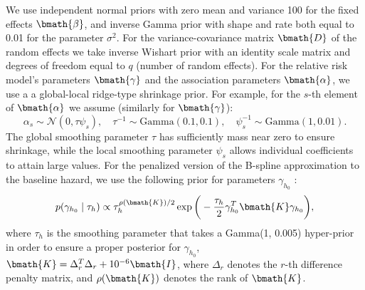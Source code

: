 We use independent normal priors with zero mean and variance 100 for the fixed effects $\bmath{\beta}$, and inverse Gamma prior with shape and rate both equal to 0.01 for the parameter $\sigma^2$. For the variance-covariance matrix $\bmath{D}$ of the random effects we take inverse Wishart prior with an identity scale matrix and degrees of freedom equal to $q$ (number of random effects). For the relative risk model's parameters $\bmath{\gamma}$ and the association parameters $\bmath{\alpha}$, we use a a global-local ridge-type shrinkage prior. For example, for the $s$-{th} element of $\bmath{\alpha}$ we assume (similarly for $\bmath{\gamma}$):
\begin{equation*} 
\alpha_s \sim \mathcal{N}(0, \tau\psi_s), \quad \tau^{-1} \sim \mbox{Gamma}(0.1, 0.1),  \quad \psi_s^{-1} \sim \mbox{Gamma}(1, 0.01).
\end{equation*} 
The global smoothing parameter $\tau$ has sufficiently mass near zero to ensure shrinkage, while the local smoothing parameter $\psi_s$ allows individual coefficients to attain large values. For the penalized version of the B-spline approximation to the baseline hazard, we use the following prior for parameters $\gamma_{h_0}$ \citep{lang2004bayesian}:
\begin{equation*}
p(\gamma_{h_0} \mid \tau_h) \propto \tau_h^{\rho(\bmath{K})/2} \exp\bigg(-\frac{\tau_h}{2}\gamma_{h_0}^T \bmath{K} \gamma_{h_0}\bigg),
\end{equation*}
where $\tau_h$ is the smoothing parameter that takes a Gamma(1, 0.005) hyper-prior in order to ensure a proper posterior for $\gamma_{h_0}$, $\bmath{K} = \Delta_r^T \Delta_r + 10^{-6} \bmath{I}$, where $\Delta_r$ denotes the $r$-th difference penalty matrix, and $\rho(\bmath{K})$ denotes the rank of $\bmath{K}$.